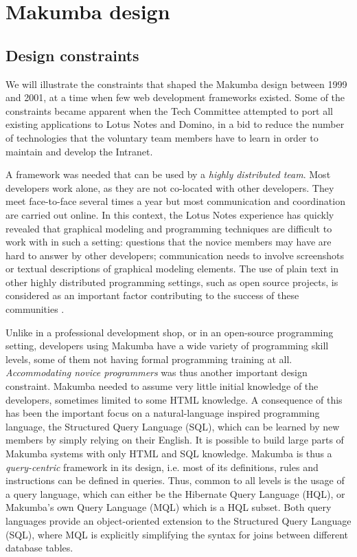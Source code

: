 \documentclass{llncs}
\begin{document}
\section{Makumba design}\label{sec:makumba}

\subsection{Design constraints}\label{sec:constraints}
We will illustrate the constraints that shaped the Makumba design between 1999 and 2001, at a time when few web development frameworks existed. Some of the constraints became apparent when the Tech Committee attempted to port all existing applications to Lotus Notes and Domino, in a bid to reduce the number of technologies that the voluntary team members have to learn in order to maintain and develop the Intranet.

A framework was needed that can be used by a \textit{highly distributed team}. Most developers work alone, as they are not co-located with other developers. They meet face-to-face several times a year but most communication and coordination are carried out online. In this context, the Lotus Notes experience has quickly revealed that graphical modeling and programming techniques are difficult to work with in such a setting: questions that the novice members may have are hard to answer by other developers; communication needs to involve screenshots or textual descriptions of graphical modeling elements. The use of plain text in other highly distributed programming settings, such as open source projects, is considered as an important factor contributing to the success of these communities \cite{yamauchi00}. 

Unlike in a professional development shop, or in an open-source programming setting, developers using Makumba have a wide variety of programming skill levels, some of them not having formal programming training at all. \textit{Accommodating novice programmers} was thus another important design constraint. Makumba needed to assume very little initial knowledge of the developers, sometimes limited to some HTML knowledge. A consequence of this has been the important focus on a natural-language inspired programming language, the Structured Query Language (SQL), which can be learned by new members by simply relying on their English. It is possible to build large parts of Makumba systems with only HTML and SQL knowledge. Makumba is thus a \textit{query-centric} framework in its design, i.e. most of its definitions, rules and instructions can be defined in queries. Thus, common to all levels is the usage of a query language, which can either be the Hibernate Query Language (HQL), or Makumba's own Query Language (MQL) which is a HQL subset. Both query languages provide an object-oriented extension to the Structured Query Language (SQL), where MQL is explicitly simplifying the syntax for joins between different database tables.
\end{document}
